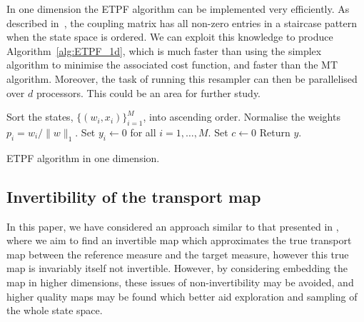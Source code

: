 \documentclass[final]{siamltex}
\begin{document}
In one
dimension the ETPF algorithm can be implemented very efficiently. As
described in~\cite{reich2013nonparametric}, the coupling matrix has
all non-zero entries in a staircase pattern when the state space is
ordered. We can exploit this knowledge to produce
Algorithm~\ref{alg:ETPF_1d}, which is much faster than using the
simplex algorithm to minimise the associated cost function, and faster
than the MT algorithm\cite{cotter2015parallel}. Moreover, the task of
running this resampler can then be parallelised over $d$
processors. This could be an area for further study.

\begin{table}[!htpb]
\begin{algorithm}[H]
\DontPrintSemicolon
\BlankLine
Sort the states, $\{(w_i, x_i)\}_{i=1}^M$, into ascending order.\;
Normalise the weights $p_i = w_i/\|w\|_1$.\;
Set $y_i \leftarrow 0$ for all $i=1,\dots,M$.\;
Set $c \leftarrow 0$\;
Return $y$.\;
\caption{ETPF algorithm in one dimension.\label{alg:ETPF_1d}}
\end{algorithm}
\end{table}

\subsection{Invertibility of the transport map}
In this paper, we have considered an approach similar to that
presented in \cite{parno2014transport}, where we aim to find an
invertible map which approximates the true transport map between the
reference measure and the target measure, however this true map is
invariably itself not invertible. However, by considering embedding
the map in higher dimensions\cite{whitney_self-intersections_1994,nash1956imbedding,takens_detecting_1981}, these issues of non-invertibility may be
avoided, and higher quality maps may be found which better aid
exploration and sampling of the whole state space.





\end{document}
